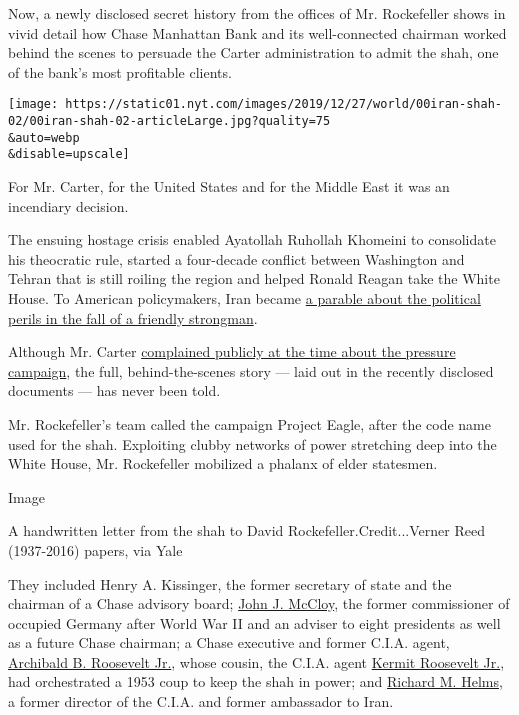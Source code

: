 Now, a newly disclosed secret history from the offices of Mr.
Rockefeller shows in vivid detail how Chase Manhattan Bank and its
well-connected chairman worked behind the scenes to persuade the Carter
administration to admit the shah, one of the bank's most profitable
clients.

\texttt{[image: https://static01.nyt.com/images/2019/12/27/world/00iran-shah-02/00iran-shah-02-articleLarge.jpg?quality=75\\\&auto=webp\\\&disable=upscale]}

For Mr. Carter, for the United States and for the Middle East it was an
incendiary decision.

The ensuing hostage crisis enabled Ayatollah Ruhollah Khomeini to
consolidate his theocratic rule, started a four-decade conflict between
Washington and Tehran that is still roiling the region and helped Ronald
Reagan take the White House. To American policymakers, Iran became
\href{https://www.commentarymagazine.com/articles/dictatorships-double-standards/}{a
parable about the political perils in the fall of a friendly strongman}.

Although Mr. Carter
\href{https://www.nytimes.com/1981/05/17/magazine/why-carter-admitted-the-shah.html}{complained
publicly at the time about the pressure campaign}, the full,
behind-the-scenes story --- laid out in the recently disclosed documents
--- has never been told.

Mr. Rockefeller's team called the campaign Project Eagle, after the code
name used for the shah. Exploiting clubby networks of power stretching
deep into the White House, Mr. Rockefeller mobilized a phalanx of elder
statesmen.

Image

A handwritten letter from the shah to David Rockefeller.Credit...Verner
Reed (1937-2016) papers, via Yale

They included Henry A. Kissinger, the former secretary of state and the
chairman of a Chase advisory board;
\href{https://www.nytimes.com/1989/03/12/obituaries/john-j-mccloy-lawyer-and-diplomat-is-dead-at-93.html}{John
J. McCloy}, the former commissioner of occupied Germany after World War
II and an adviser to eight presidents as well as a future Chase
chairman; a Chase executive and former C.I.A. agent,
\href{https://www.nytimes.com/1990/06/01/obituaries/a-b-roosevelt-a-cia-veteran-and-banking-official-dies-at-72.html}{Archibald
B. Roosevelt Jr.}, whose cousin, the C.I.A. agent
\href{https://www.nytimes.com/2000/06/11/us/kermit-roosevelt-leader-of-cia-coup-in-iran-dies-at-84.html}{Kermit
Roosevelt Jr.}, had orchestrated a 1953 coup to keep the shah in power;
and
\href{https://www.nytimes.com/2002/10/23/obituaries/richard-m-helms-dies-at-89-dashing-exchief-of-the-cia.html}{Richard
M. Helms}, a former director of the C.I.A. and former ambassador to
Iran.


